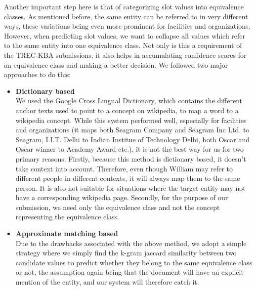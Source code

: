 Another important step here is that of categorizing slot values into equivalence classes. As mentioned before, the same entity can be referred to in very different ways, these variations being even more prominent for facilities and organizations. However, when predicting slot values, we want to collapse all values which refer to the same entity into one equivalence class. Not only is this a requirement of the TREC-KBA submissions, it also helps in accumulating confidence scores for an equivalence class and making a better decision. We followed two major approaches to do this:
\begin{itemize}[label={}]
\item \textbf{Dictionary based}\\
We used the Google Cross Lingual Dictionary, which contains the different anchor texts used to point to a concept on wikipedia, to map a word to a wikipedia concept. While this system performed well, especially for facilities and organizations (it maps both Seagram Company and Seagram Inc Ltd. to Seagram, I.I.T. Delhi to Indian Institue of Technology Delhi, both Oscar and Oscar winner to Academy Award etc.), it is not the best way for us for two primary reasons. Firstly, because this method is dictionary based, it doesn’t take context into account. Therefore, even though William may refer to different people in different contexts, it will always map them to the same person. It is also not suitable for situations where the target entity may not have a corresponding wikipedia page. Secondly, for the purpose of our submission, we need only the equivalence class and not the concept representing the equivalence class.
\item \textbf{Approximate matching based} \\
Due to the drawbacks associated with the above method, we adopt a simple strategy where we simply find the k-gram jaccard similarity between two candidate values to predict whether they belong to the same equivalence class or not, the assumption again being that the document will have an explicit mention of the entity, and our system will therefore catch it.
\end{itemize}

